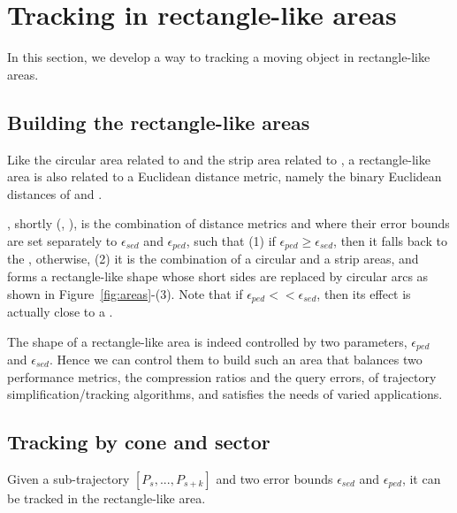 

\section{Tracking in rectangle-like areas}
\label{sec:rectangle}

In this section, we develop a way to tracking a moving object in rectangle-like areas.


\subsection{Building the rectangle-like areas}

Like the circular area related to \sed and the strip area related to \ped, a rectangle-like area is also related to a Euclidean distance metric, namely the binary Euclidean distances of \sed and \ped.

, shortly \bed (\sed, \ped), is the combination of distance metrics \sed and \ped where their error bounds are set separately to $\epsilon_{sed}$ and $\epsilon_{ped}$, such that (1) if $\epsilon_{ped} \ge \epsilon_{sed}$, then it falls back to the \sed, otherwise, (2) it is the combination of a circular and a strip areas, and forms a rectangle-like shape whose short sides are replaced by circular arcs as shown in {Figure~\ref{fig:areas}-(3)}. Note that if $\epsilon_{ped} << \epsilon_{sed}$, then its effect is actually close to a \ped.


The shape of a rectangle-like area is indeed controlled by two parameters, $\epsilon_{ped}$ and $\epsilon_{sed}$. Hence we can control them to build such an area that balances two performance metrics, the compression ratios and the query errors, of trajectory simplification/tracking algorithms, and satisfies the needs of varied applications. 


\subsection{Tracking by cone and sector}

\begin{theorem}
	\label{theo-binary}
	Given a sub-trajectory $[P_s,...,P_{s+k}]$ and two error bounds $\epsilon_{sed}$ and $\epsilon_{ped}$, it can be tracked in the rectangle-like area.
\end{theorem}

